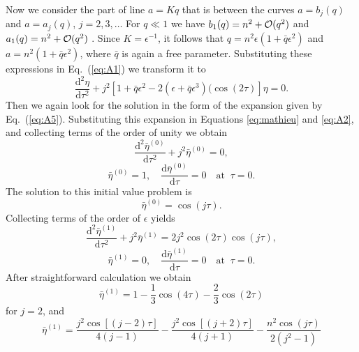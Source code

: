 Now we consider the part of line $a = Kq$ that is between the curves $a = b_j(q)$ and $a = a_j(q)$, $j = 2,3,\dots$ For $q \ll 1$ we have $b_1(q) = n^2 + {\cal O}(q^2)$ and $a_1(q) = n^2 + {\cal O}(q^2)$ \citep{Abramowitz1965}. Since $K = \epsilon^{-1}$\/, it follows that $q = n^2\epsilon(1 + \bar q\epsilon^2)$ and $a = n^2(1 + \bar q\epsilon^2)$, where $\bar q$ is again a free parameter. Substituting these expressions in Eq.~(\ref{eq:A1}) we transform it to
%
\begin{equation}
\frac{\mathrm{d}^2\eta}{\mathrm{d}\tau^2} + j^2[1 + \bar q\epsilon^2 - 
   2(\epsilon + \bar q\epsilon^3)(\cos(2 \tau)] \eta = 0.
\label{eq:A18} 
\end{equation}
%
Then we again look for the solution in the form of the expansion given by Eq.~(\ref{eq:A5}). Substituting this expansion in Equations \eqref{eq:mathieu} and \eqref{eq:A2}, and collecting terms of the order of unity we obtain
%
\begin{equation}
\frac{\mathrm{d}^2\bar\eta^{(0)}}{\mathrm{d}\tau^2} + j^2\bar\eta^{(0)} = 0,
\label{eq:A19} 
\end{equation}
% 
\begin{equation}
\bar\eta^{(0)} = 1, \quad \frac{\mathrm{d}\bar\eta^{(0)}}{\mathrm{d}\tau} = 0 
   \quad \mbox{at} \;\; \tau = 0.
\label{eq:A20}
\end{equation}
%
The solution to this initial value problem is
% 
\begin{equation}
\bar\eta^{(0)} = \cos(j\tau).
\label{eq:A21}
\end{equation}
%
Collecting terms of the order of $\epsilon$ yields
%
\begin{equation}
\frac{\mathrm{d}^2\bar\eta^{(1)}}{\mathrm{d}\tau^2} + j^2\bar\eta^{(1)} = 
   2j^2\cos(2\tau)\cos(j\tau) ,
\label{eq:A22} 
\end{equation}
% 
\begin{equation}
\bar\eta^{(1)} = 0, \quad \frac{\mathrm{d}\bar\eta^{(1)}}{\mathrm{d}\tau} = 0 
   \quad \mbox{at} \;\; \tau = 0.
\label{eq:A23}
\end{equation}
%
After straightforward calculation we obtain
% 
\begin{equation}
\bar\eta^{(1)} = 1 - \frac13\cos(4\tau) - \frac23\cos(2\tau)
\label{eq:A24}
\end{equation}
%
for $j = 2$, and 
% 
\begin{equation}
\bar\eta^{(1)} = \frac{j^2\cos[(j-2)\tau]}{4(j - 1)} - 
   \frac{j^2\cos[(j+2)\tau]}{4(j + 1)} - \frac{n^2\cos(j\tau)}{2(j^2 - 1)}
\label{eq:A25}
\end{equation}
